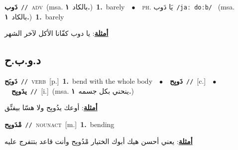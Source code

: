 \documentclass[10pt,a4paper,twoside]{article} %
\begin{document}
\begin{multicols}{2}
{\setlength\topsep{0pt}\textbf{\foreignlanguage{arabic}{دَوب}}\ {\color{gray}\texttt{//}\color{black}}\ \textsc{adv}\ \color{gray}(msa. \foreignlanguage{arabic}{بالكاد}~\foreignlanguage{arabic}{\textbf{١.}})\color{black}\ \textbf{1.}~barely\ \ $\bullet$\ \ \textsc{ph.} \color{gray} \foreignlanguage{arabic}{يَا دَوب}\color{black}\ {\color{gray}\texttt{/{\sffamily jaː doːb}/}\color{black}}\ \color{gray} (msa. \foreignlanguage{arabic}{بالكاد}~\foreignlanguage{arabic}{\textbf{١.}})\color{black}\ \textbf{1.}~barely\  \begin{flushright}\color{gray}\foreignlanguage{arabic}{\textbf{\underline{\foreignlanguage{arabic}{أمثلة}}}: يا دوب كفّانا الأكل لآخر الشهر}\end{flushright}\color{black}} \vspace{2mm}

\vspace{-3mm}
\subsection*{\color{blue}\foreignlanguage{arabic}{د.و.ب.ح}\color{blue}{}} 

{\setlength\topsep{0pt}\textbf{\foreignlanguage{arabic}{دَوبَح}}\ {\color{gray}\texttt{//}\color{black}}\ \textsc{verb}\ [p.]\ \textbf{1.}~bend with the whole body\ \ $\bullet$\ \ \setlength\topsep{0pt}\textbf{\foreignlanguage{arabic}{دَوبِح}}\ {\color{gray}\texttt{//}\color{black}}\ [c.]\ \ $\bullet$\ \ \setlength\topsep{0pt}\textbf{\foreignlanguage{arabic}{يدَوبِح}}\ {\color{gray}\texttt{//}\color{black}}\ [i.]\ \color{gray}(msa. \foreignlanguage{arabic}{ينحني بكل جسمه}~\foreignlanguage{arabic}{\textbf{١.}})\color{black}\  \begin{flushright}\color{gray}\foreignlanguage{arabic}{\textbf{\underline{\foreignlanguage{arabic}{أمثلة}}}: أوعك يدُوبِح ولا هسّا بيفتِّق}\end{flushright}\color{black}} \vspace{2mm}

{\setlength\topsep{0pt}\textbf{\foreignlanguage{arabic}{مْدَوبِح}}\ {\color{gray}\texttt{//}\color{black}}\ \textsc{noun\textunderscore act}\ [m.]\ \textbf{1.}~bending\  \begin{flushright}\color{gray}\foreignlanguage{arabic}{\textbf{\underline{\foreignlanguage{arabic}{أمثلة}}}: يعني أحسن هيك أبوك الختيار مْدُوبِح وأنت قاعد بتتفرج عليه}\end{flushright}\color{black}} \vspace{2mm}


\end{multicols}
\end{document}
